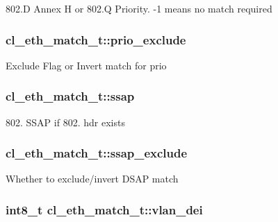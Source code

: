 802.\-D Annex H or 802.\-Q Priority. -\/1 means no match required \hypertarget{structcl__eth__match__t_a239951c73fc57983cfbedbb886ba5dcc}{
\subsubsection[{prio\-\_\-exclude}]{ cl\-\_\-eth\-\_\-match\-\_\-t\-::prio\-\_\-exclude}}\label{structcl__eth__match__t_a239951c73fc57983cfbedbb886ba5dcc}
Exclude Flag or Invert match for prio \hypertarget{structcl__eth__match__t_af5927252a40f04d6aa2ef8104ec8ea88}{
\subsubsection[{ssap}]{ cl\-\_\-eth\-\_\-match\-\_\-t\-::ssap}}\label{structcl__eth__match__t_af5927252a40f04d6aa2ef8104ec8ea88}
802. S\-S\-A\-P if 802. hdr exists \hypertarget{structcl__eth__match__t_a410d143164a36bfb7ba1bf7ad0895e89}{
\subsubsection[{ssap\-\_\-exclude}]{ cl\-\_\-eth\-\_\-match\-\_\-t\-::ssap\-\_\-exclude}}\label{structcl__eth__match__t_a410d143164a36bfb7ba1bf7ad0895e89}
Whether to exclude/invert D\-S\-A\-P match \hypertarget{structcl__eth__match__t_aa59030fe883d3341c9d323cb53b3cb59}{
\subsubsection[{vlan\-\_\-dei}]{\setlength{\rightskip}{0pt plus 5cm}int8\-\_\-t cl\-\_\-eth\-\_\-match\-\_\-t\-::vlan\-\_\-dei}}\label{structcl__eth__match__t_aa59030fe883d3341c9d323cb53b3cb59}
